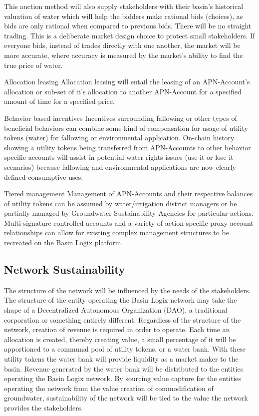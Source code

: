 \documentclass{tufte-handout}
\begin{document}
This auction method will also supply stakeholders with their basin's historical valuation of water which will help the bidders make rational bids (choices), as bids are only rational when compared to previous bids\cite{Allingham}. There will be no straight trading. This is a deliberate market design choice to protect small stakeholders\cite{Raffensperger}. If everyone bids, instead of trades directly with one another, the market will be more accurate, where accuracy is measured by the market's ability to find the true price of water.\break

Allocation leasing \break
Allocation leasing will entail the leasing of an APN-Account's allocation or sub-set of it's allocation to another APN-Account for a specified amount of time for a specified price.\break

Behavior based incentives \break
Incentives surrounding fallowing or other types of beneficial behaviors can combine some kind of compensation for usage of utility tokens (water) for fallowing or environmental application\cite{tule}. On-chain history showing a utility tokens being transferred from APN-Accounts to other behavior specific accounts will assist in potential water rights issues (use it or lose it scenarios) because fallowing and environmental applications are now clearly defined consumptive uses.\break

Tiered management \break
Management of APN-Accounts and their respective balances of utility tokens can be assumed by water/irrigation district managers or be partially managed by Groundwater Sustainability Agencies for particular actions. Multi-signature controlled accounts and a variety of action specific proxy account relationships\cite{proxy} can allow for existing complex management structures to be recreated on the Basin Logix platform.\break 

\subsection{Network Sustainability}\label{sec:headings}

 The structure of the network will be influenced by the needs of the stakeholders. The structure of the entity operating the Basin Logix network may take the shape of a Decentralized Autonomous Organization (DAO), a traditional corporation or something entirely different. Regardless of the structure of the network, creation of revenue is required in order to operate. Each time an allocation is created, thereby creating value, a small percentage of it will be apportioned to a communal pool of utility tokens, or a water bank. With these utility tokens the water bank will provide liquidity as a market maker to the basin. Revenue generated by the water bank will be distributed to the entities operating the Basin Logix network. By sourcing value capture for the entities operating the network from the value creation of commodification of groundwater, sustainability of the network will be tied to the value the network provides the stakeholders. 
\end{document}
